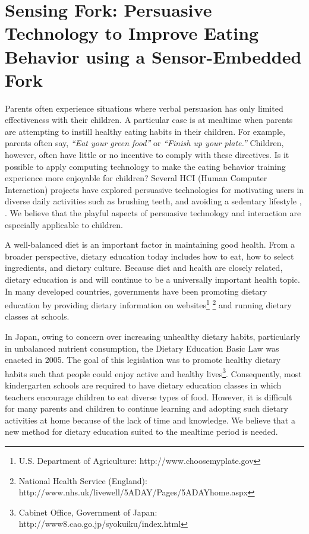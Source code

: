 \newpage
\section{Sensing Fork: Persuasive Technology to Improve Eating Behavior using a Sensor-Embedded Fork}

Parents often experience situations where verbal persuasion 
has only limited effectiveness with their children. 
A particular case is at mealtime when parents are attempting 
to instill healthy eating habits in their children. 
For example, parents often say, \textit{``Eat your green food''} 
or \textit{``Finish up your plate.''} 
Children, however, often have little or no incentive to comply with these directives. 
Is it possible to apply computing technology to make the eating behavior training experience 
more enjoyable for children? 
Several HCI (Human Computer Interaction) projects have explored 
persuasive technologies \cite{Fogg:2002} for motivating users in diverse daily activities 
such as brushing teeth, and avoiding a sedentary lifestyle \cite{Chang:2008}, \cite{Lin:2006}. 
We believe that the playful aspects of persuasive technology and interaction 
are especially applicable to children.

A well-balanced diet is an important factor in maintaining good health. 
From a broader perspective, dietary education today includes how to eat, 
how to select ingredients, and dietary culture. 
Because diet and health are closely related, dietary education 
is and will continue to be a universally important health topic. 
In many developed countries, governments have been promoting dietary education 
by providing dietary information on websites\footnote{U.S. Department of Agriculture: 
\newline http://www.choosemyplate.gov} \footnote{National Health Service (England): 
\newline http://www.nhs.uk/livewell/5ADAY/Pages/5ADAYhome.aspx} and running dietary classes at schools.

In Japan, owing to concern over increasing unhealthy dietary habits, 
particularly in unbalanced nutrient consumption, 
the Dietary Education Basic Law was enacted in 2005. 
The goal of this legislation was to promote healthy dietary habits 
such that people could enjoy active 
and healthy lives\footnote{Cabinet Office, Government of Japan: 
\newline http://www8.cao.go.jp/syokuiku/index.html}. 
Consequently, most kindergarten schools are required to have dietary education classes 
in which teachers encourage children to eat diverse types of food. 
However, it is difficult for many parents and children to continue learning 
and adopting such dietary activities at home because of the lack of time and knowledge. 
We believe that a new method for dietary education suited to the mealtime period is needed.

